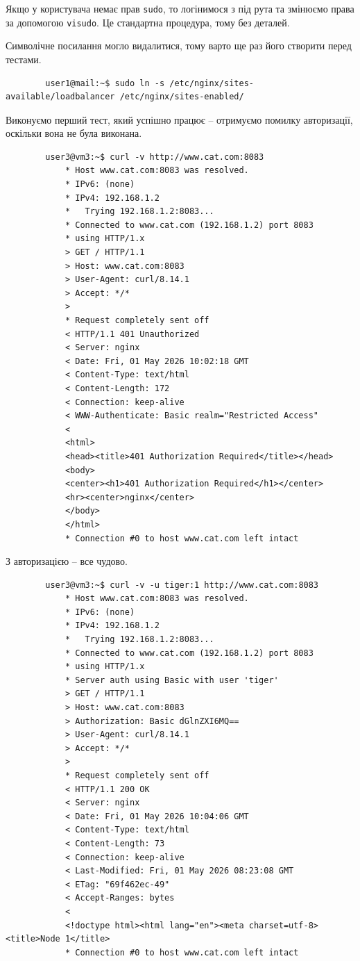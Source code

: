 \documentclass[14pt, a4paper]{extreport}
\begin{document}
	Якщо у користувача немає прав \texttt{sudo}, то логінимося з під рута та змінюємо права за допомогою \texttt{visudo}. Це стандартна процедура, тому без деталей.
	
	Символічне посилання могло видалитися, тому варто ще раз його створити перед тестами. \sideat{[VM 1]}
	
	\begin{verbatim}
		user1@mail:~$ sudo ln -s /etc/nginx/sites-available/loadbalancer /etc/nginx/sites-enabled/
	\end{verbatim}
	
	Виконуємо перший тест, який успішно працює -- отримуємо помилку авторизації, оскільки вона не була виконана. \sideat{[VM 3]}
	
	\begin{verbatim}
		user3@vm3:~$ curl -v http://www.cat.com:8083
			* Host www.cat.com:8083 was resolved.
			* IPv6: (none)
			* IPv4: 192.168.1.2
			*   Trying 192.168.1.2:8083...
			* Connected to www.cat.com (192.168.1.2) port 8083
			* using HTTP/1.x
			> GET / HTTP/1.1
			> Host: www.cat.com:8083
			> User-Agent: curl/8.14.1
			> Accept: */*
			> 
			* Request completely sent off
			< HTTP/1.1 401 Unauthorized
			< Server: nginx
			< Date: Fri, 01 May 2026 10:02:18 GMT
			< Content-Type: text/html
			< Content-Length: 172
			< Connection: keep-alive
			< WWW-Authenticate: Basic realm="Restricted Access"
			< 
			<html>
			<head><title>401 Authorization Required</title></head>
			<body>
			<center><h1>401 Authorization Required</h1></center>
			<hr><center>nginx</center>
			</body>
			</html>
			* Connection #0 to host www.cat.com left intact
	\end{verbatim}
	
	З авторизацією -- все чудово. \sideat{[VM 3]}
	
	\begin{verbatim}
		user3@vm3:~$ curl -v -u tiger:1 http://www.cat.com:8083
			* Host www.cat.com:8083 was resolved.
			* IPv6: (none)
			* IPv4: 192.168.1.2
			*   Trying 192.168.1.2:8083...
			* Connected to www.cat.com (192.168.1.2) port 8083
			* using HTTP/1.x
			* Server auth using Basic with user 'tiger'
			> GET / HTTP/1.1
			> Host: www.cat.com:8083
			> Authorization: Basic dGlnZXI6MQ==
			> User-Agent: curl/8.14.1
			> Accept: */*
			> 
			* Request completely sent off
			< HTTP/1.1 200 OK
			< Server: nginx
			< Date: Fri, 01 May 2026 10:04:06 GMT
			< Content-Type: text/html
			< Content-Length: 73
			< Connection: keep-alive
			< Last-Modified: Fri, 01 May 2026 08:23:08 GMT
			< ETag: "69f462ec-49"
			< Accept-Ranges: bytes
			< 
			<!doctype html><html lang="en"><meta charset=utf-8><title>Node 1</title>
			* Connection #0 to host www.cat.com left intact
	\end{verbatim}
	
\end{document}
